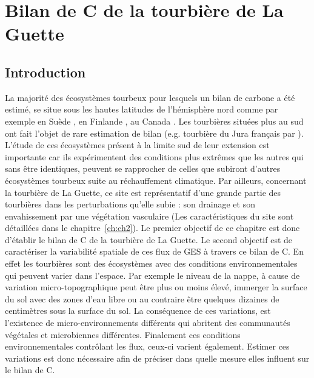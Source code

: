 \singlespacing
\chapter{Bilan de C de la tourbière de La Guette}
\label{ch:ch3}

\minitoc

\newpage
\doublespacing
\section{Introduction}
La majorité des écosystèmes tourbeux pour lesquels un bilan de carbone a été estimé, se situe sous les hautes latitudes de l'hémisphère nord comme par exemple en Suède \citep{waddington2000,peichl2014}, en Finlande \citep{Alm1997}, au Canada \citep{trudeau2014}.
Les tourbières situées plus au sud ont fait l'objet de rare estimation de bilan (e.g. tourbière du Jura français par \citet{bortoluzzi2006a}).
L'étude de ces écosystèmes présent à la limite sud de leur extension est importante car ils expérimentent des conditions plus extrêmes que les autres qui sans être identiques, peuvent se rapprocher de celles que subiront d'autres écosystèmes tourbeux suite au réchauffement climatique.
Par ailleurs, concernant la tourbière de La Guette, ce site est représentatif d'une grande partie des tourbières dans les perturbations qu'elle subie : son drainage et son envahissement par une végétation vasculaire (Les caractéristiques du site sont détaillées dans le chapitre~\ref{ch:ch2}).
Le premier objectif de ce chapitre est donc d'établir le bilan de C de la tourbière de La Guette.
Le second objectif est de caractériser la variabilité spatiale de ces flux de GES à travers ce bilan de C.
En effet les tourbières sont des écosystèmes avec des conditions environnementales qui peuvent varier dans l'espace.
Par exemple le niveau de la nappe, à cause de variation micro-topographique peut être plus ou moins élevé, immerger la surface du sol avec des zones d'eau libre ou au contraire être quelques dizaines de centimètres sous la surface du sol.
La conséquence de ces variations, est l'existence de micro-environnements différents qui abritent des communautés végétales et microbiennes différentes.
Finalement ces conditions environnementales contrôlant les flux, ceux-ci varient également.
Estimer ces variations est donc nécessaire afin de préciser dans quelle mesure elles influent sur le bilan de C.

